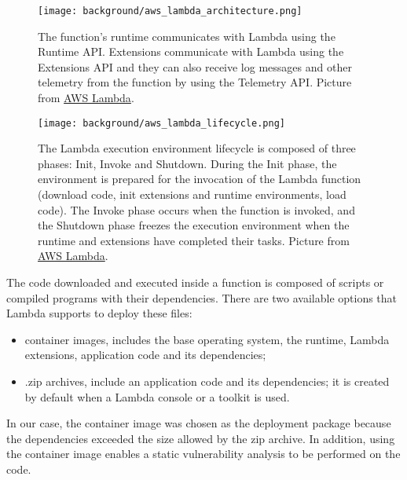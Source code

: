 \documentclass[../thesis.tex]{subfiles}
\begin{document}
\begin{figure}[H]
    \centering
    \texttt{[image: background/aws\_lambda\_architecture.png]}
    \caption[Lambda execution environment]{The function's runtime communicates with Lambda using the Runtime \acrshort{API}. Extensions communicate with Lambda using the Extensions \acrshort{API} and they can also receive log messages and other telemetry from the function by using the Telemetry \acrshort{API}. Picture from \href{https://docs.aws.amazon.com/lambda/latest/dg/lambda-runtime-environment.html}{AWS Lambda}.}
    \label{fig:aws_lambda_architecture}
\end{figure}

\begin{figure}[H]
    \centering
    \texttt{[image: background/aws\_lambda\_lifecycle.png]}
    \caption[Lambda execution environment lifecycle]{The Lambda execution environment lifecycle is composed of three phases: Init, Invoke and Shutdown. During the Init phase, the environment is prepared for the invocation of the Lambda function (download code, init extensions and runtime environments, load code). The Invoke phase occurs when the function is invoked, and the Shutdown phase freezes the execution environment when the runtime and extensions have completed their tasks. Picture from \href{https://docs.aws.amazon.com/lambda/latest/dg/lambda-runtime-environment.html}{AWS Lambda}.}
    \label{fig:aws_lambda_lifecycle}
\end{figure}

The code downloaded and executed inside a function is composed of scripts or compiled programs with their dependencies. There are two available options that Lambda supports to deploy these files:

\begin{itemize}
    \item \gls{container} images, includes the base operating system, the runtime, Lambda extensions, application code and its dependencies;
    \item .zip archives, include an application code and its dependencies; it is created by default when a Lambda console or a toolkit is used.
\end{itemize}

In our case, the \gls{container} image was chosen as the deployment package because the dependencies exceeded the size allowed by the zip archive. In addition, using the \gls{container} image enables a static vulnerability analysis to be performed on the code.
\end{document}
